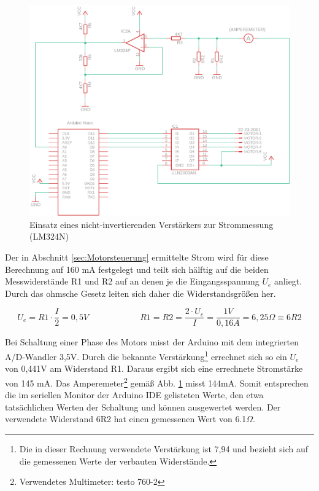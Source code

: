 \documentclass[11pt, titlepage]{report}
\begin{document}
				\begin{figure}[htbp]
					\centering
					\includegraphics[width=\linewidth]{./img/op2.png}
					\caption[Einsatz eines nicht-invertierenden Verstärkers zur Strommessung]{Einsatz eines nicht-invertierenden Verstärkers zur Strommessung (LM324N)
					\label{fig:imgOP}}			
				\end{figure}
				\newpage

				Der in Abschnitt \ref{sec:Motorsteuerung} ermittelte Strom wird für diese Berechnung auf 160 mA festgelegt und teilt sich hälftig auf die beiden Messwiderstände R1 und R2 auf an denen je die Eingangsspannung $U_{e}$ anliegt. Durch das ohmsche Gesetz leiten sich daher die Widerstandsgrößen her.

				\begin{equation}
					U_{e}=R1\cdot\frac{I}{2}=0,5V \hspace{6em} R1=R2=\frac{2\cdot U_{e}}{I}=\frac{1V}{0,16A}=6,25\Omega \equiv 6R2
				\end{equation}

				Bei Schaltung einer Phase des Motors misst der Arduino mit dem integrierten A/D-Wandler 3,5V. Durch die bekannte Verstärkung\footnote{Die in dieser Rechnung verwendete Verstärkung ist 7,94 und bezieht sich auf die gemessenen Werte der verbauten Widerstände.} errechnet sich so ein $U_{e}$ von 0,441V am Widerstand R1. Daraus ergibt sich eine errechnete Stromstärke von 145 mA. Das Amperemeter\footnote{Verwendetes Multimeter: testo 760-2} gemäß Abb. \ref{fig:imgOP} misst 144mA. Somit entsprechen die im seriellen Monitor der Arduino IDE gelisteten Werte, den etwa tatsächlichen Werten der Schaltung und können ausgewertet werden. Der verwendete Widerstand 6R2 hat einen gemessenen Wert von 6.1$\Omega$.
\end{document}
